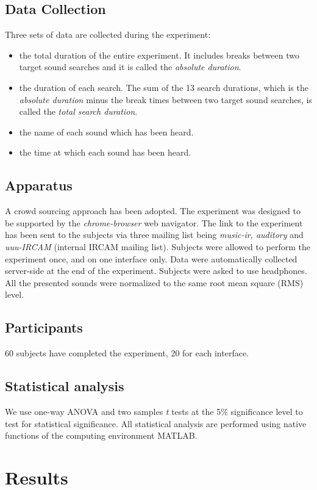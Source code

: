 \documentclass{aes2e}
\begin{document}
\subsection{Data Collection}
Three sets of data are collected during the experiment:
\begin{itemize}
\item the total duration of the entire experiment. It includes breaks between two target sound searches and it is called the \textit{absolute duration}.
\item the duration of each search. The sum of the 13 search durations, which is the \textit{absolute duration} minus the break times between two target sound searches, is called the \textit{total search duration}.
\item the name of each sound which has been heard.
\item the time at which each sound has been heard.  
\end{itemize}

\subsection{Apparatus}
A crowd sourcing approach has been adopted. The experiment was designed to be supported by the  \textit{chrome-browser} web navigator. The link to the experiment has been sent to the subjects via three  mailing list being \textit{music-ir, auditory} and \textit{uuu-IRCAM} (internal IRCAM mailing list). Subjects were allowed to perform the experiment once, and on one interface only. Data were automatically collected server-side at the end of the experiment. Subjects were asked to use headphones. All the presented sounds were normalized to the same root mean square (RMS) level.

\subsection{Participants}
60 subjects have completed the experiment, 20 for each interface.

\subsection{Statistical analysis}
We use one-way ANOVA and two samples \textit{t} tests at the 5\% significance level to test for statistical significance. All statistical analysis are performed using native functions of the computing environment MATLAB.


\section{Results} \label{results}
\end{document}
